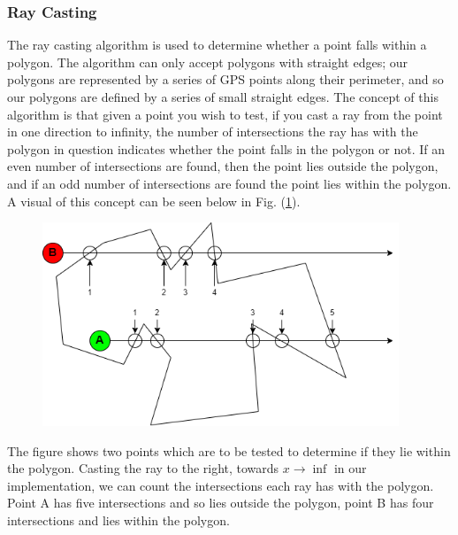 \documentclass[11pt,landscape]{article}
\begin{document}
\begin{multicols}{3}
\subsubsection{Ray Casting}
The ray casting algorithm is used to determine whether a point falls within a
polygon. The algorithm can only accept polygons with straight edges; our
polygons are represented by a series of GPS points along their perimeter, and so
our polygons are defined by a series of small straight edges. The concept of
this algorithm is that given a point you wish to test, if you cast a ray from
the point in one direction to infinity, the number of intersections the ray has
with the polygon in question indicates whether the point falls in the polygon or
not. If an even number of intersections are found, then the point lies outside
the polygon, and if an odd number of intersections are found the point lies
within the polygon. A visual of this concept can be seen below in Fig.
(\ref{fig:raycasting}).
\begin{figure}[H]
    \begin{mdframed}
        \begin{center}
            \includegraphics[width=0.95\textwidth]{raycasting.png}
        \end{center}
    \end{mdframed}
    \label{fig:raycasting}
\end{figure}

The figure shows two points which are to be tested to determine if they lie
within the polygon. Casting the ray to the right, towards $x\rightarrow\inf$ in
our implementation, we can count the intersections each ray has with the
polygon. Point A has five intersections and so lies outside the polygon, point B
has four intersections and lies within the polygon. 


\end{multicols}
\end{document}
